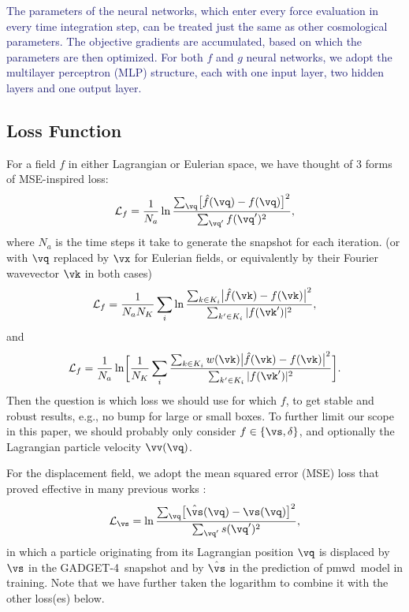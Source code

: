 \documentclass[modern, trackchanges, dvipsnames]{aastex631}
\newcommand{\pmwd}{{\usefont{T1}{nova}{m}{sl}pmwd}}
\newcommand{\GADGET}{{{\fontsize{10pt}{12pt}\selectfont GADGET}-4}}
\newcommand{\cL}{\mathcal{L}}
\newcommand{\YL}[1]{\textcolor{Bittersweet}{#1}}
\newcommand{\YZ}[1]{\textcolor{MidnightBlue}{#1}}
\begin{document}
\YZ{
The parameters of the neural networks, which enter every force evaluation in
every time integration step, can be treated just the same as other cosmological
parameters.
The objective gradients are accumulated, based on which the parameters are then
optimized.
For both $f$ and $g$ neural networks, we adopt the multilayer perceptron (MLP)
structure, each with one input layer, two hidden layers and one output layer.
}


\vspace{1em}
\subsection{Loss Function}

\YL{
For a field $f$ in either Lagrangian or Eulerian space, we have thought
of 3 forms of MSE-inspired loss:
%
\begin{equation}
\cL_f = \frac1{N_a} \ln
  \frac{\sum_\vq \bigl[ \hat f(\vq) - f(\vq) \bigr]^2}
       {\sum_{\vq'} f(\vq')^2},
\end{equation}
%
where $N_a$ is the time steps it take to generate the snapshot for each
iteration.
(or with $\vq$ replaced by $\vx$ for Eulerian fields, or equivalently by
their Fourier wavevector $\vk$ in both cases)
%
\begin{equation}
\cL_f = \frac1{N_a N_K} \sum_i \ln
\frac{\sum_{k \in K_i} \bigl| \hat f(\vk) - f(\vk) \bigr|^2}
     {\sum_{k' \in K_i} | f(\vk')|^2},
\end{equation}
%
and
%
\begin{equation}
\cL_f = \frac1{N_a} \ln \biggl[ \frac1{N_K} \sum_i
\frac{\sum_{k \in K_i} w(\vk)
      \bigl| \hat f(\vk) - f(\vk) \bigr|^2}
     {\sum_{k' \in K_i} |f(\vk')|^2} \biggl].
\end{equation}
%
Then the question is which loss we should use for which $f$, to get
stable and robust results, e.g., no bump for large or small boxes.
To further limit our scope in this paper, we should probably only
consider $f \in \{\vs, \delta\}$, and optionally the Lagrangian particle
velocity $\vv(\vq)$.
}

For the displacement field, we adopt the mean squared error (MSE) loss
that proved effective in many previous works
\citep[e.g.,][]{HeEtAl2019, LiEtAl2021}:
%
\begin{equation}
\cL_\vs = \ln \frac{\sum_\vq \bigl[ \hat\vs(\vq) - \vs(\vq) \bigr]^2}
                   {\sum_{\vq'} s(\vq')^2},
\end{equation}
%
in which a particle originating from its Lagrangian position $\vq$ is
displaced by $\vs$ in the \GADGET\ snapshot and by $\hat\vs$ in the
prediction of \pmwd\ model in training.
Note that we have further taken the logarithm to combine it with the
other loss(es) below.
\end{document}
